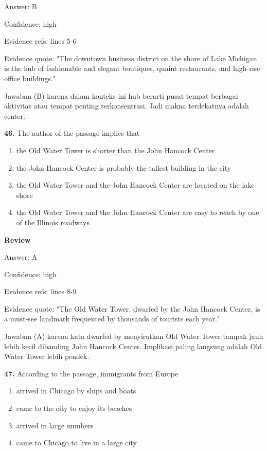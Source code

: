 \documentclass[12pt]{article}
\begin{document}
Answer: B\par
Confidence: high\par
Evidence refs: lines 5-6\par
Evidence quote: "The downtown business district on the shore of Lake Michigan is the hub of fashionable and elegant boutiques, quaint restaurants, and high-rise office buildings."\par
Jawaban (B) karena dalam konteks ini hub berarti pusat tempat berbagai aktivitas atau tempat penting terkonsentrasi. Jadi makna terdekatnya adalah center.\par
\endgroup
\par
\vspace{0.25\baselineskip}
\noindent\textbf{46.} The author of the passage implies that
\begin{enumerate}[label=(\Alph*),leftmargin=*,itemsep=0.2em]
\item the Old Water Tower is shorter than the John Hancock Center
\item the John Hancock Center is probably the tallest building in the city
\item the Old Water Tower and the John Hancock Center are located on the lake shore
\item the Old Water Tower and the John Hancock Center are easy to reach by one of the Illinois roadways
\end{enumerate}
\par
\begingroup
\setlength{\parskip}{0pt}
\setlength{\parindent}{0pt}
\textbf{Review}\par
Answer: A\par
Confidence: high\par
Evidence refs: lines 8-9\par
Evidence quote: "The Old Water Tower, dwarfed by the John Hancock Center, is a must-see landmark frequented by thousands of tourists each year."\par
Jawaban (A) karena kata dwarfed by menyiratkan Old Water Tower tampak jauh lebih kecil dibanding John Hancock Center. Implikasi paling langsung adalah Old Water Tower lebih pendek.\par
\endgroup
\par
\vspace{0.25\baselineskip}
\noindent\textbf{47.} According to the passage, immigrants from Europe
\begin{enumerate}[label=(\Alph*),leftmargin=*,itemsep=0.2em]
\item arrived in Chicago by ships and boats
\item came to the city to enjoy its beaches
\item arrived in large numbers
\item came to Chicago to live in a large city
\end{enumerate}
\end{document}
